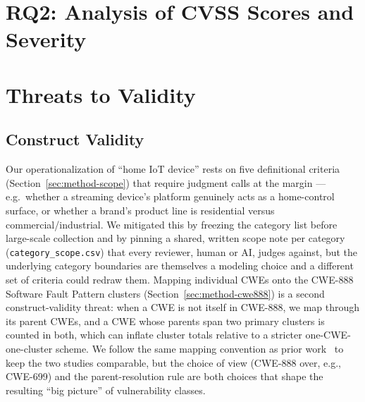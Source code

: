 \documentclass[conference]{IEEEtran}
\begin{document}
\subsection{}
\label{sec:rq1-cat1}


\subsection{}
\label{sec:rq1-cat2}


\subsection{}
\label{sec:rq1-cat3}


\subsection{}
\label{sec:rq1-cat4}


\section{RQ2: Analysis of CVSS Scores and Severity}
\label{sec:rq2}


\section{Threats to Validity}
\label{sec:threats}

\subsection{Construct Validity}
\label{sec:threats-construct}

Our operationalization of ``home IoT device'' rests on five definitional criteria
(Section~\ref{sec:method-scope}) that require judgment calls at the margin --- e.g.\
whether a streaming device's platform genuinely acts as a home-control surface, or
whether a brand's product line is residential versus commercial/industrial. We
mitigated this by freezing the category list before large-scale collection and by
pinning a shared, written scope note per category (\texttt{category\_scope.csv}) that
every reviewer, human or AI, judges against, but the underlying category boundaries
are themselves a modeling choice and a different set of criteria could redraw them.
Mapping individual CWEs onto the CWE-888 Software Fault Pattern clusters
(Section~\ref{sec:method-cwe888}) is a second construct-validity threat: when a CWE is
not itself in CWE-888, we map through its parent CWEs, and a CWE whose parents span two
primary clusters is counted in both, which can inflate cluster totals relative to a
stricter one-CWE-one-cluster scheme. We follow the same mapping convention as prior
work~\cite{ref-mcsoftware} to keep the two studies comparable, but the choice of view
(CWE-888 over, e.g., CWE-699) and the parent-resolution rule are both choices that
shape the resulting ``big picture'' of vulnerability classes.
\end{document}
